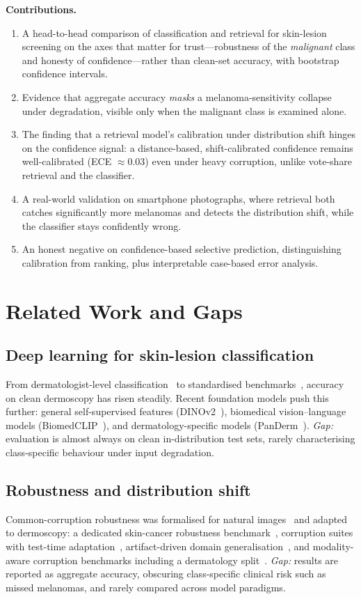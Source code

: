 \documentclass[conference]{IEEEtran}
\begin{document}
\noindent\textbf{Contributions.}
\begin{enumerate}
\item A head-to-head comparison of classification and retrieval for skin-lesion
screening on the axes that matter for trust---robustness of the \emph{malignant}
class and honesty of confidence---rather than clean-set accuracy, with bootstrap
confidence intervals.
\item Evidence that aggregate accuracy \emph{masks} a melanoma-sensitivity
collapse under degradation, visible only when the malignant class is examined
alone.
\item The finding that a retrieval model's calibration under distribution shift
hinges on the confidence signal: a distance-based, shift-calibrated confidence
remains well-calibrated (ECE $\approx0.03$) even under heavy corruption, unlike
vote-share retrieval and the classifier.
\item A real-world validation on smartphone photographs, where retrieval both
catches significantly more melanomas and detects the distribution shift, while
the classifier stays confidently wrong.
\item An honest negative on confidence-based selective prediction, distinguishing
calibration from ranking, plus interpretable case-based error analysis.
\end{enumerate}

\section{Related Work and Gaps}
\subsection{Deep learning for skin-lesion classification}
From dermatologist-level classification~\cite{esteva2017} to standardised
benchmarks~\cite{tschandl2018,codella2018}, accuracy on clean dermoscopy has
risen steadily. Recent foundation models push this further: general
self-supervised features (DINOv2~\cite{oquab2024}), biomedical vision--language
models (BiomedCLIP~\cite{zhang2025biomedclip}), and dermatology-specific models
(PanDerm~\cite{yan2025panderm}). \emph{Gap:} evaluation is almost always on
clean in-distribution test sets, rarely characterising class-specific behaviour
under input degradation.

\subsection{Robustness and distribution shift}
Common-corruption robustness was formalised for natural
images~\cite{hendrycks2019} and adapted to dermoscopy: a dedicated skin-cancer
robustness benchmark~\cite{maron2021}, corruption suites with test-time
adaptation~\cite{hu2024diffusion}, artifact-driven domain
generalisation~\cite{bissoto2022artifact}, and modality-aware corruption
benchmarks including a dermatology split~\cite{disalvo2024medmnistc}.
\emph{Gap:} results are reported as aggregate accuracy, obscuring class-specific
clinical risk such as missed melanomas, and rarely compared across model
paradigms.
\end{document}

